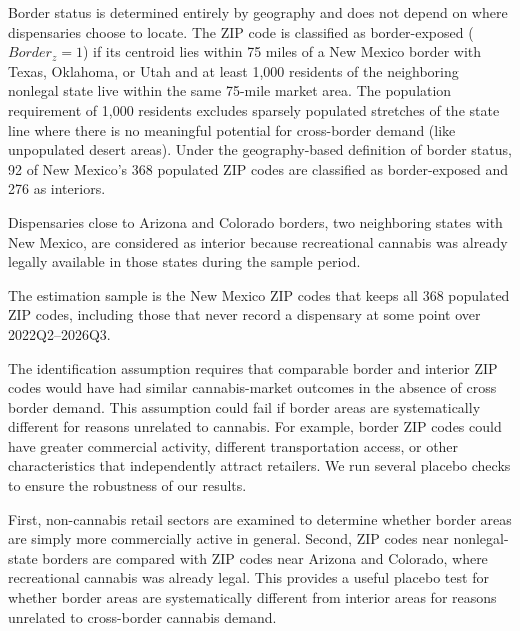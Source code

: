 \documentclass[english,12pt]{article}
\begin{document}
Border status is determined entirely by geography and does not depend on where dispensaries choose to locate. The ZIP code is classified as border-exposed ($Border_z=1$) if its centroid lies within 75 miles of a New Mexico border with Texas, Oklahoma, or Utah and at least 1,000 residents of the neighboring nonlegal state live within the same 75-mile market area. The population requirement of 1,000 residents excludes sparsely populated stretches of the state line where there is no meaningful potential for cross-border demand (like unpopulated desert areas).
Under the geography-based definition of border status, 92 of New Mexico's 368 populated ZIP codes are classified as border-exposed and 276 as interiors.

Dispensaries close to Arizona and Colorado borders, two neighboring states with New Mexico, are considered as interior because recreational cannabis was already legally available in those states during the sample period.

The estimation sample is the New Mexico ZIP codes that keeps all 368 populated ZIP codes, including those that never record a dispensary at some point over 2022Q2--2026Q3. 

The identification assumption requires that comparable border and interior ZIP codes would have had similar cannabis-market outcomes in the absence of cross border demand. This assumption could fail if border areas are systematically different for reasons unrelated to cannabis. For example, border ZIP codes could have greater commercial activity, different transportation access, or other characteristics that independently attract retailers. We run several placebo checks to ensure the robustness of our results.

First, non-cannabis retail sectors are examined to determine whether border areas are simply more commercially active in general. Second, ZIP codes near nonlegal-state borders are compared with ZIP codes near Arizona and Colorado, where recreational cannabis was already legal. This provides a useful placebo test for whether border areas are systematically different from interior areas for reasons unrelated to cross-border cannabis demand.
\end{document}
